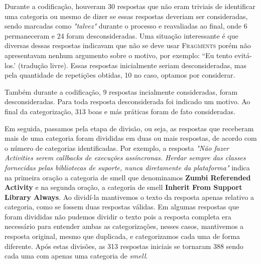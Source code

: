 Durante a codifica\c{c}\~ao, houveram 30 respostas que n\~ao eram triviais de identificar uma categoria ou mesmo de dizer se essas respostas deveriam ser consideradas, sendo marcadas como \textit{"talvez"} durante o processo e reavaliadas ao final, onde 6 permaneceram e 24 foram desconsideradas. Uma situa\c{c}\~ao interessante \'e que diversas dessas respostas indicavam que n\~ao se deve usar \textsc{Fragments} por\'em n\~ao apresentavam nenhum argumento sobre o motivo, por exemplo: ``Eu tento evit\'a-los.' (tradu\c{c}\~ao livre). Essas respostas inicialmente seriam desconsideradas, mas pela quantidade de repeti\c{c}\~oes obtidas, 10 no caso, optamos por considerar.

Tamb\'em durante a codifica\c{c}\~ao, 9 respostas incialmente consideradas, foram desconsideradas. Para toda resposta desconsiderada foi indicado um motivo. Ao final da categoriza\c{c}\~ao, 313 boas e m\'as pr\'aticas foram de fato consideradas.


Em seguida, passamos pela etapa de divis\~ao, ou seja, as respostas que receberam mais de uma categoria foram divididas em duas ou mais respostas, de acordo com o n\'umero de categorias identificadas. Por exemplo, a resposta \textit{"N\~ao fazer Activities serem callbacks de execu\c{c}\~oes ass\'incronas. Herdar sempre das classes fornecidas pelas bibliotecas de suporte, nunca diretamente da plataforma"} indica na primeira ora\c{c}\~ao a categoria de smell que denominamos \textbf{Zumbi Referended Activity} e na segunda ora\c{c}\~ao, a categoria de smell \textbf{Inherit From Support Library Always}. Ao divid\'i-la mantivemos o texto da resposta apenas relativo a categoria, como se fossem duas respostas v\'alidas. Em algumas respostas que foram divididas n\~ao pudemos dividir o texto pois a resposta completa era necess\'ario para entender ambas as categoriza\c{c}\~oes, nesses casos, mantivemos a resposta original, mesmo que duplicada, e categorizamos cada uma de forma diferente. Ap\'os estas divis\~oes, as 313 respostas iniciais se tornaram 388 sendo cada uma com apenas uma categoria de \textit{smell}. 

